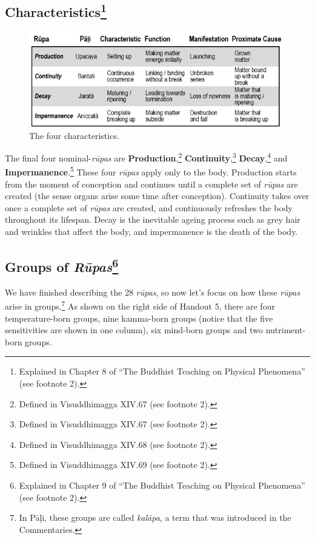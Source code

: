 \subsection*{Characteristics\footnote{Explained in Chapter 8 of “The Buddhist Teaching on Physical Phenomena” (see footnote 2).}}

\begin{figure}[h]
\centering
\includegraphics[width=0.8\linewidth]{./Diagrams/Characteristics}
\caption{The four characteristics.}
\label{fig:Characteristics}
\end{figure}

The final four nominal-\textit{rūpas} are \textbf{Production},\footnote{Defined in Visuddhimagga XIV.67 (see footnote 2).} \textbf{Continuity},\footnote{Defined in Visuddhimagga XIV.67 (see footnote 2).} \textbf{Decay},\footnote{Defined in Visuddhimagga XIV.68 (see footnote 2).} and \textbf{Impermanence}.\footnote{Defined in Visuddhimagga XIV.69 (see footnote 2).} These four \textit{rūpas} apply only to the body. Production starts from the moment of conception and continues until a complete set of \textit{rūpas} are created (the sense organs arise some time after conception). Continuity takes over once a complete set of \textit{rūpas} are created, and continuously refreshes the body throughout its lifespan. Decay is the inevitable ageing process such as grey hair and wrinkles that affect the body, and impermanence is the death of the body.

\subsection*{Groups of \textit{Rūpas}\footnote{Explained in Chapter 9 of “The Buddhist Teaching on Physical Phenomena” (see footnote 2).}}

We have finished describing the 28 \textit{rūpas}, so now let’s focus on how these \textit{rūpas} arise in groups.\footnote{In Pāḷi, these groups are called \textit{kalāpa}, a term that was introduced in the Commentaries.} As shown on the right side of Handout 5, there are four temperature-born groups, nine kamma-born groups (notice that the five sensitivities are shown in one column), six mind-born groups and two nutriment-born groups.

